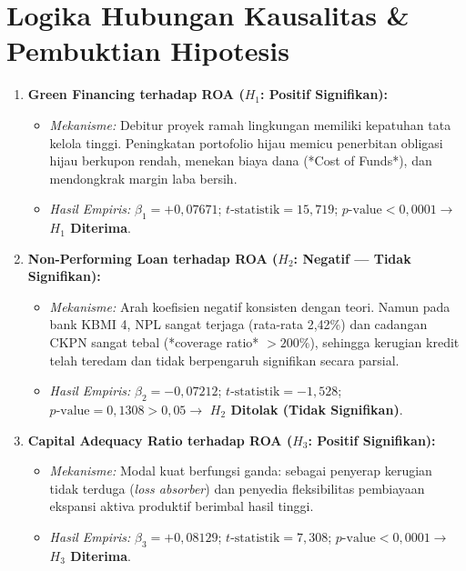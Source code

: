 \documentclass[11pt,a4paper]{article}
\begin{document}
\section{Logika Hubungan Kausalitas \& Pembuktian Hipotesis}

\begin{enumerate}
    \item \textbf{Green Financing terhadap ROA ($H_1$: Positif Signifikan):}
    \begin{itemize}
        \item \textit{Mekanisme:} Debitur proyek ramah lingkungan memiliki kepatuhan tata kelola tinggi. Peningkatan portofolio hijau memicu penerbitan obligasi hijau berkupon rendah, menekan biaya dana (*Cost of Funds*), dan mendongkrak margin laba bersih.
        \item \textit{Hasil Empiris:} $\beta_1 = +0{,}07671$; $t\text{-statistik} = 15{,}719$; $p\text{-value} < 0{,}0001 \rightarrow$ \textbf{$H_1$ Diterima}.
    \end{itemize}

    \item \textbf{Non-Performing Loan terhadap ROA ($H_2$: Negatif — Tidak Signifikan):}
    \begin{itemize}
        \item \textit{Mekanisme:} Arah koefisien negatif konsisten dengan teori. Namun pada bank KBMI 4, NPL sangat terjaga (rata-rata 2,42\%) dan cadangan CKPN sangat tebal (*coverage ratio* $> 200\%$), sehingga kerugian kredit telah teredam dan tidak berpengaruh signifikan secara parsial.
        \item \textit{Hasil Empiris:} $\beta_2 = -0{,}07212$; $t\text{-statistik} = -1{,}528$; $p\text{-value} = 0{,}1308 > 0{,}05 \rightarrow$ \textbf{$H_2$ Ditolak (Tidak Signifikan)}.
    \end{itemize}

    \item \textbf{Capital Adequacy Ratio terhadap ROA ($H_3$: Positif Signifikan):}
    \begin{itemize}
        \item \textit{Mekanisme:} Modal kuat berfungsi ganda: sebagai penyerap kerugian tidak terduga (\textit{loss absorber}) dan penyedia fleksibilitas pembiayaan ekspansi aktiva produktif berimbal hasil tinggi.
        \item \textit{Hasil Empiris:} $\beta_3 = +0{,}08129$; $t\text{-statistik} = 7{,}308$; $p\text{-value} < 0{,}0001 \rightarrow$ \textbf{$H_3$ Diterima}.
    \end{itemize}


\end{enumerate}
\end{document}
